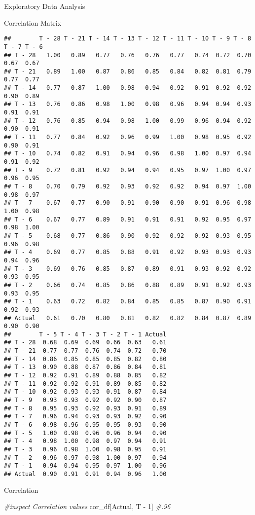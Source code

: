 \documentclass[
  ignorenonframetext,
]{beamer}
\newenvironment{Shaded}{\begin{snugshade}}{\end{snugshade}}
\newcommand{\CommentTok}[1]{\textcolor[rgb]{0.56,0.35,0.01}{\textit{#1}}}
\newcommand{\NormalTok}[1]{#1}
\newcommand{\StringTok}[1]{\textcolor[rgb]{0.31,0.60,0.02}{#1}}
\begin{document}
\begin{frame}[fragile]{Exploratory Data Analysis}
\begin{block}{Correlation Matrix}
\begin{verbatim}
##        T - 28 T - 21 T - 14 T - 13 T - 12 T - 11 T - 10 T - 9 T - 8 T - 7 T - 6
## T - 28   1.00   0.89   0.77   0.76   0.76   0.77   0.74  0.72  0.70  0.67  0.67
## T - 21   0.89   1.00   0.87   0.86   0.85   0.84   0.82  0.81  0.79  0.77  0.77
## T - 14   0.77   0.87   1.00   0.98   0.94   0.92   0.91  0.92  0.92  0.90  0.89
## T - 13   0.76   0.86   0.98   1.00   0.98   0.96   0.94  0.94  0.93  0.91  0.91
## T - 12   0.76   0.85   0.94   0.98   1.00   0.99   0.96  0.94  0.92  0.90  0.91
## T - 11   0.77   0.84   0.92   0.96   0.99   1.00   0.98  0.95  0.92  0.90  0.91
## T - 10   0.74   0.82   0.91   0.94   0.96   0.98   1.00  0.97  0.94  0.91  0.92
## T - 9    0.72   0.81   0.92   0.94   0.94   0.95   0.97  1.00  0.97  0.96  0.95
## T - 8    0.70   0.79   0.92   0.93   0.92   0.92   0.94  0.97  1.00  0.98  0.97
## T - 7    0.67   0.77   0.90   0.91   0.90   0.90   0.91  0.96  0.98  1.00  0.98
## T - 6    0.67   0.77   0.89   0.91   0.91   0.91   0.92  0.95  0.97  0.98  1.00
## T - 5    0.68   0.77   0.86   0.90   0.92   0.92   0.92  0.93  0.95  0.96  0.98
## T - 4    0.69   0.77   0.85   0.88   0.91   0.92   0.93  0.93  0.93  0.94  0.96
## T - 3    0.69   0.76   0.85   0.87   0.89   0.91   0.93  0.92  0.92  0.93  0.95
## T - 2    0.66   0.74   0.85   0.86   0.88   0.89   0.91  0.92  0.93  0.93  0.95
## T - 1    0.63   0.72   0.82   0.84   0.85   0.85   0.87  0.90  0.91  0.92  0.93
## Actual   0.61   0.70   0.80   0.81   0.82   0.82   0.84  0.87  0.89  0.90  0.90
##        T - 5 T - 4 T - 3 T - 2 T - 1 Actual
## T - 28  0.68  0.69  0.69  0.66  0.63   0.61
## T - 21  0.77  0.77  0.76  0.74  0.72   0.70
## T - 14  0.86  0.85  0.85  0.85  0.82   0.80
## T - 13  0.90  0.88  0.87  0.86  0.84   0.81
## T - 12  0.92  0.91  0.89  0.88  0.85   0.82
## T - 11  0.92  0.92  0.91  0.89  0.85   0.82
## T - 10  0.92  0.93  0.93  0.91  0.87   0.84
## T - 9   0.93  0.93  0.92  0.92  0.90   0.87
## T - 8   0.95  0.93  0.92  0.93  0.91   0.89
## T - 7   0.96  0.94  0.93  0.93  0.92   0.90
## T - 6   0.98  0.96  0.95  0.95  0.93   0.90
## T - 5   1.00  0.98  0.96  0.96  0.94   0.90
## T - 4   0.98  1.00  0.98  0.97  0.94   0.91
## T - 3   0.96  0.98  1.00  0.98  0.95   0.91
## T - 2   0.96  0.97  0.98  1.00  0.97   0.94
## T - 1   0.94  0.94  0.95  0.97  1.00   0.96
## Actual  0.90  0.91  0.91  0.94  0.96   1.00
\end{verbatim}
\end{block}

\begin{block}{Correlation}
\protect\hypertarget{correlation}{}
\begin{Shaded}
\begin{Highlighting}[]
\CommentTok{\#inspect Correlation values}
\NormalTok{cor\_df[}\StringTok{\textquotesingle{}Actual\textquotesingle{}}\NormalTok{, }\StringTok{\textquotesingle{}T {-} 1\textquotesingle{}}\NormalTok{] }\CommentTok{\#.96}
\end{Highlighting}
\end{Shaded}


\end{block}
\end{frame}
\end{document}
